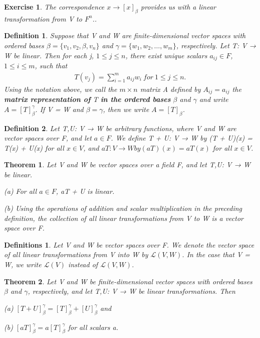 \documentclass{article}
\newcommand{\bd}[1]{\textbf{#1}}
\theoremstyle{plain}
\newtheorem{theorem}{Theorem}[section]
\newtheorem*{definition1}{Definition}
\newtheorem*{definitions}{Definitions}
\newtheorem*{exercise}{Exercise}
\theoremstyle{plain} %
\begin{document}
\begin{exercise}
The correspondence $x \to [x]_\beta$ provides us with a linear transformation from V to $F^n$..
\end{exercise}

\begin{definition1}
Suppose that V and W are finite-dimensional vector spaces with ordered bases $\beta = \{v_1, v_2, \beta ,v_n\}$ and $\gamma = \{w_1, w_2, \ldots ,w_m\}$, respectively. Let T: V → W be linear. Then for each j, $1 \leq  j \leq  n$, there exist unique scalars $a_{ij} \in F$, $1 \leq  i \leq  m$, such that
\begin{align*}
T(v_j ) =  \sum_{i=1}^m a_{ij}w_i~for~1\leq  j \leq n.
\end{align*}
Using the notation above, we call the $m\times n$ matrix A defined by $A_{ij} = a_{ij}$ the \bd{matrix representation of} T \bd{in the ordered bases} $\beta$ and $\gamma$ and write $A = [T]^\gamma_\beta$. If V = W and $\beta = \gamma$, then we write $A = [T]_\beta$.
\end{definition1}

\begin{definition1}
Let T,U: V → W be arbitrary functions, where V and W are vector spaces over F, and let $a \in F$. We define T + U: V → W by
(T + U)(x) = T(x) + U(x) for all $x \in V$, and $aT: V → W by (aT)(x) = aT(x)$ for all $x \in V$.
\end{definition1}

\begin{theorem}
Let V and W be vector spaces over a field F, and let T,U: V → W be linear.

(a) For all $a \in F$, aT + U is linear.

(b) Using the operations of addition and scalar multiplication in the preceding definition, the collection of all linear transformations from V to W is a vector space over F.
\end{theorem}

\begin{definitions}
Let V and W be vector spaces over F. We denote the vector space of all linear transformations from V into W by $\mathcal L(V, W)$. In the case that V = W, we write $\mathcal L(V)$ instead of $\mathcal L(V, W)$.
\end{definitions}

\begin{theorem}
Let V and W be finite-dimensional vector spaces with ordered bases $\beta$ and $\gamma$, respectively, and let T,U: V → W be linear transformations. Then

(a) $[T + U]^\gamma_\beta = [T]^\gamma_\beta+ [U]^\gamma_\beta$ and

(b) $[aT]^\gamma_\beta = a[T]^\gamma_\beta$ for all scalars a.
\end{theorem}
\end{document}
